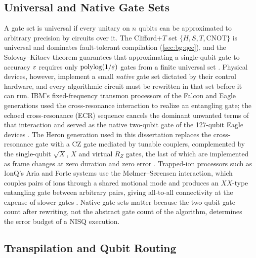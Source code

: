 \subsection{Universal and Native Gate Sets}

A gate set is universal if every unitary on $n$ qubits can be approximated to arbitrary precision by circuits over it. The Clifford$+T$ set $\{H,S,T,\mathrm{CNOT}\}$ is universal and dominates fault-tolerant compilation (\cref{sec:bg:qec}), and the Solovay--Kitaev theorem guarantees that approximating a single-qubit gate to accuracy $\varepsilon$ requires only $\mathrm{polylog}(1/\varepsilon)$ gates from a finite universal set \cite{nielsen2010qcqi}. Physical devices, however, implement a small \emph{native} gate set dictated by their control hardware, and every algorithmic circuit must be rewritten in that set before it can run. IBM's fixed-frequency transmon processors of the Falcon and Eagle generations used the cross-resonance interaction to realize an entangling gate; the echoed cross-resonance (ECR) sequence cancels the dominant unwanted terms of that interaction and served as the native two-qubit gate of the 127-qubit Eagle devices \cite{sheldon2016echoedcr,bravyi2022futuresc}. The Heron generation used in this dissertation replaces the cross-resonance gate with a CZ gate mediated by tunable couplers, complemented by the single-qubit $\sqrt{X}$, $X$ and virtual $R_Z$ gates, the last of which are implemented as frame changes at zero duration and zero error \cite{mckay2017virtualz}. Trapped-ion processors such as IonQ's Aria and Forte systems use the M{\o}lmer--S{\o}rensen interaction, which couples pairs of ions through a shared motional mode and produces an $XX$-type entangling gate between arbitrary pairs, giving all-to-all connectivity at the expense of slower gates \cite{sorensen1999ms}. Native gate sets matter because the two-qubit gate count after rewriting, not the abstract gate count of the algorithm, determines the error budget of a NISQ execution.

\subsection{Transpilation and Qubit Routing}

